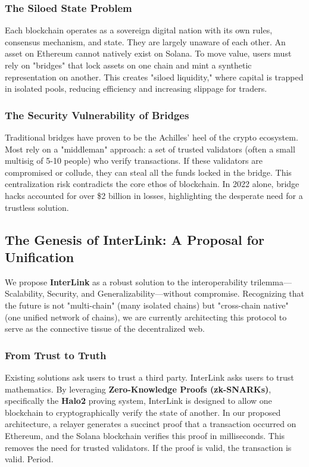 \documentclass[11pt,a4paper]{article}
\begin{document}
\subsubsection{The Siloed State Problem}
Each blockchain operates as a sovereign digital nation with its own rules, consensus mechanism, and state. They are largely unaware of each other. An asset on Ethereum cannot natively exist on Solana. To move value, users must rely on "bridges" that lock assets on one chain and mint a synthetic representation on another. This creates "siloed liquidity," where capital is trapped in isolated pools, reducing efficiency and increasing slippage for traders.

\subsubsection{The Security Vulnerability of Bridges}
Traditional bridges have proven to be the Achilles' heel of the crypto ecosystem. Most rely on a "middleman" approach: a set of trusted validators (often a small multisig of 5-10 people) who verify transactions. If these validators are compromised or collude, they can steal all the funds locked in the bridge. This centralization risk contradicts the core ethos of blockchain. In 2022 alone, bridge hacks accounted for over \$2 billion in losses, highlighting the desperate need for a trustless solution.

\subsection{The Genesis of InterLink: A Proposal for Unification}
We propose \textbf{InterLink} as a robust solution to the interoperability trilemma---Scalability, Security, and Generalizability---without compromise. Recognizing that the future is not "multi-chain" (many isolated chains) but "cross-chain native" (one unified network of chains), we are currently architecting this protocol to serve as the connective tissue of the decentralized web.

\subsubsection{From Trust to Truth}
Existing solutions ask users to trust a third party. InterLink asks users to trust mathematics. By leveraging \textbf{Zero-Knowledge Proofs (zk-SNARKs)}, specifically the \textbf{Halo2} proving system, InterLink is designed to allow one blockchain to cryptographically verify the state of another. In our proposed architecture, a relayer generates a succinct proof that a transaction occurred on Ethereum, and the Solana blockchain verifies this proof in milliseconds. This removes the need for trusted validators. If the proof is valid, the transaction is valid. Period.
\end{document}
